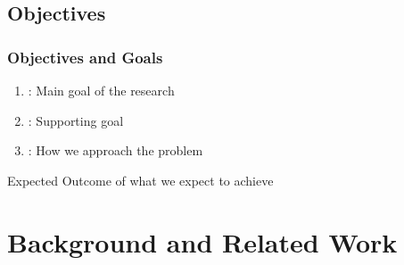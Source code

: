 \subsection{Objectives}
\begin{frame}
    \frametitle{Objectives and Goals}
    \begin{enumerate}
        \item {}: Main goal of the research
        \item {}: Supporting goal
        \item {}: How we approach the problem
    \end{enumerate}
    
    \vspace{1em}
    \begin{alertblock}{Expected Outcome}
         of what we expect to achieve
    \end{alertblock}
\end{frame}

\section{Background and Related Work}

